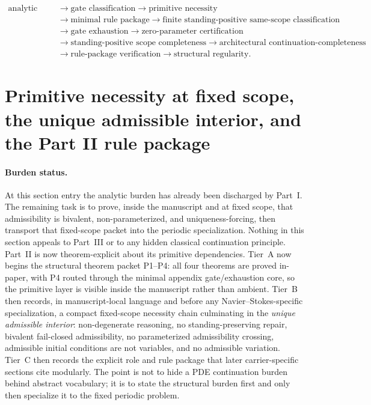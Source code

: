 \begin{tcolorbox}[title=Navier--Stokes admissibility cascade]
\[
\begin{aligned}
\text{analytic atlas}
&\rightarrow \text{gate classification}
\rightarrow \text{primitive necessity}\\
&\rightarrow \text{minimal rule package}
\rightarrow \text{finite standing-positive same-scope classification}\\
&\rightarrow \text{gate exhaustion}
\rightarrow \text{zero-parameter certification}\\
&\rightarrow \text{standing-positive scope completeness}
\rightarrow \text{architectural continuation-completeness}\\
&\rightarrow \text{rule-package verification}
\rightarrow \text{structural regularity}.
\end{aligned}
\]
\end{tcolorbox}


\section{Primitive necessity at fixed scope, the unique admissible interior, and the Part II rule package}\label{sec:primitive-base}
\paragraph{Burden status.}
At this section entry the analytic burden has already been discharged by Part~I. The remaining task is to prove, inside the manuscript and at fixed scope, that admissibility is bivalent, non-parameterized, and uniqueness-forcing, then transport that fixed-scope packet into the periodic specialization. Nothing in this section appeals to Part~III or to any hidden classical continuation principle.
Part~II is now theorem-explicit about its primitive dependencies. Tier~A now begins the structural theorem packet P1--P4: all four theorems are proved in-paper, with P4 routed through the minimal appendix gate/exhaustion core, so the primitive layer is visible inside the manuscript rather than ambient. Tier~B then records, in manuscript-local language and before any Navier--Stokes-specific specialization, a compact fixed-scope necessity chain culminating in the \emph{unique admissible interior}: non-degenerate reasoning, no standing-preserving repair, bivalent fail-closed admissibility, no parameterized admissibility crossing, admissible initial conditions are not variables, and no admissible variation. Tier~C then records the explicit role and rule package that later carrier-specific sections cite modularly. The point is not to hide a PDE continuation burden behind abstract vocabulary; it is to state the structural burden first and only then specialize it to the fixed periodic problem.

